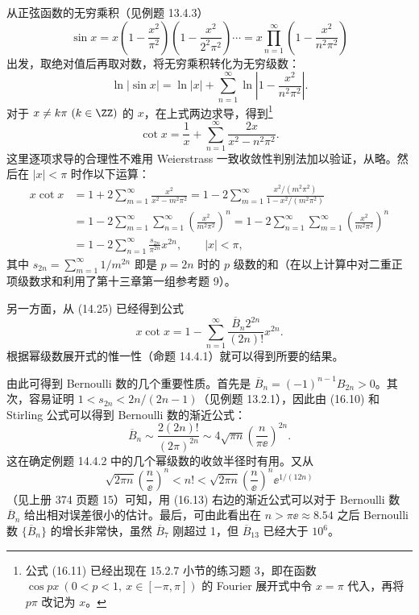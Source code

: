 \begin{xproof}
从正弦函数的无穷乘积（见例题 13.4.3）
\[
  \sin x=x\left(1-\frac{x^2}{\pi^2}\right)
  \left(1-\frac{x^2}{2^2\pi^2}\right)\cdots
  =x\prod_{n=1}^{\infty}\left(1-\frac{x^2}{n^2\pi^2}\right)
\]
出发，取绝对值后再取对数，将无穷乘积转化为无穷级数：
\[
  \ln|\sin x|=\ln|x|+\sum_{n=1}^{\infty}\ln\left|1-\frac{x^2}{n^2\pi^2}\right|.
\]
对于 $x\ne k\pi\ (k\in\ZZ)$ 的 $x$，在上式两边求导，得到\footnote{公式 (16.11) 已经出现在 15.2.7 小节的练习题 3，即在函数 $\cos px\ (0<p<1,\ x\in[-\pi,\pi])$ 的 Fourier 展开式中令 $x=\pi$ 代入，再将 $p\pi$ 改记为 $x$。}
\begin{equation}
  \cot x=\frac1x+\sum_{n=1}^{\infty}\frac{2x}{x^2-n^2\pi^2}.
\tag{16.11}
\label{eq:16.11}
\end{equation}
这里逐项求导的合理性不难用 Weierstrass 一致收敛性判别法加以验证，从略。然后在 $|x|<\pi$ 时作以下运算：
\[
\begin{aligned}
  x\cot x
  &=1+2\sum_{m=1}^{\infty}\frac{x^2}{x^2-m^2\pi^2}
   =1-2\sum_{m=1}^{\infty}\frac{x^2/(m^2\pi^2)}{1-x^2/(m^2\pi^2)}\\
  &=1-2\sum_{m=1}^{\infty}\sum_{n=1}^{\infty}
      \left(\frac{x^2}{m^2\pi^2}\right)^n
   =1-2\sum_{n=1}^{\infty}\sum_{m=1}^{\infty}
      \left(\frac{x^2}{m^2\pi^2}\right)^n\\
  &=1-2\sum_{n=1}^{\infty}\frac{s_{2n}}{\pi^{2n}}x^{2n},
  \qquad |x|<\pi,
\end{aligned}
\]
其中 $s_{2n}=\sum_{m=1}^{\infty}1/m^{2n}$ 即是 $p=2n$ 时的 $p$ 级数的和（在以上计算中对二重正项级数求和利用了第十三章第一组参考题 9）。

另一方面，从 (14.25) 已经得到公式
\begin{equation}
  x\cot x=1-\sum_{n=1}^{\infty}\frac{\overline B_n2^{2n}}{(2n)!}x^{2n}.
\tag{16.12}
\label{eq:16.12}
\end{equation}
根据幂级数展开式的惟一性（命题 14.4.1）就可以得到所要的结果。
\end{xproof}

\begin{xremark}
由此可得到 Bernoulli 数的几个重要性质。首先是 $\overline B_n=(-1)^{n-1}B_{2n}>0$。其次，容易证明 $1<s_{2n}<2n/(2n-1)$（见例题 13.2.1），因此由 (16.10) 和 Stirling 公式可以得到 Bernoulli 数的渐近公式：
\begin{equation}
  \overline B_n\sim\frac{2(2n)!}{(2\pi)^{2n}}
  \sim4\sqrt{\pi n}\left(\frac{n}{\pi\ee}\right)^{2n}.
\tag{16.13}
\label{eq:16.13}
\end{equation}
这在确定例题 14.4.2 中的几个幂级数的收敛半径时有用。又从
\[
  \sqrt{2\pi n}\left(\frac n\ee\right)^n<n!
  <\sqrt{2\pi n}\left(\frac n\ee\right)^n\ee^{1/(12n)}
\]
（见上册 374 页题 15）可知，用 (16.13) 右边的渐近公式可以对于 Bernoulli 数 $\overline B_n$ 给出相对误差很小的估计。最后，可由此看出在 $n>\pi\ee\approx8.54$ 之后 Bernoulli 数 $\{\overline B_n\}$ 的增长非常快，虽然 $\overline B_7$ 刚超过 1，但 $\overline B_{13}$ 已经大于 $10^6$。
\end{xremark}

